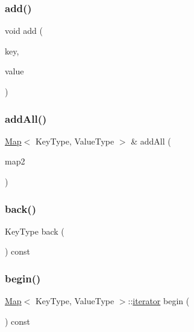 \subsubsection{\texorpdfstring{add()}{add()}}
{\footnotesize\ttfamily void add (\begin{DoxyParamCaption}\item[{const Key\+Type \&}]{key,  }\item[{const Value\+Type \&}]{value }\end{DoxyParamCaption})}

\mbox{\label{classMap_a44f4dae7b5abf1bd265cd5e8cb6cf47b}} 
\subsubsection{\texorpdfstring{add\+All()}{addAll()}}
{\footnotesize\ttfamily \mbox{\hyperlink{classMap}{Map}}$<$ Key\+Type, Value\+Type $>$ \& add\+All (\begin{DoxyParamCaption}\item[{const \mbox{\hyperlink{classMap}{Map}}$<$ Key\+Type, Value\+Type $>$ \&}]{map2 }\end{DoxyParamCaption})}

\mbox{\label{classMap_adfa4b8f8e4f5ecc11fb76a3efba70d70}} 
\subsubsection{\texorpdfstring{back()}{back()}}
{\footnotesize\ttfamily Key\+Type back (\begin{DoxyParamCaption}{ }\end{DoxyParamCaption}) const}

\mbox{\label{classMap_aa70377b8ab33c528e81e1a7e7b9da9fc}} 
\subsubsection{\texorpdfstring{begin()}{begin()}}
{\footnotesize\ttfamily \mbox{\hyperlink{classMap}{Map}}$<$ Key\+Type, Value\+Type $>$\+::\mbox{\hyperlink{classMap_ab3d10e70baaeac78e76b7abae7e2cf76}{iterator}} begin (\begin{DoxyParamCaption}{ }\end{DoxyParamCaption}) const}

